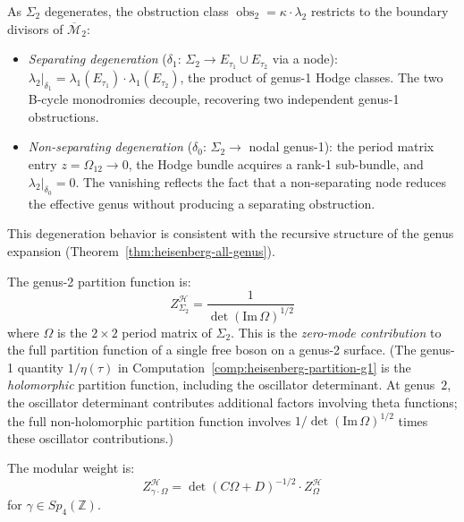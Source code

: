 \begin{remark}\label{rem:genus2-degeneration}
As $\Sigma_2$ degenerates, the obstruction class $\operatorname{obs}_2 = \kappa \cdot \lambda_2$ restricts to the boundary divisors of $\overline{\mathcal{M}}_2$:
\begin{itemize}
\item \emph{Separating degeneration}
  ($\delta_1$: $\Sigma_2 \to E_{\tau_1} \cup E_{\tau_2}$
  via a node):
  $\lambda_2|_{\delta_1}
  = \lambda_1(E_{\tau_1}) \cdot \lambda_1(E_{\tau_2})$,
  the product of genus-1 Hodge classes.  The two B-cycle
  monodromies decouple, recovering two independent
  genus-1 obstructions.
\item \emph{Non-separating degeneration}
  ($\delta_0$: $\Sigma_2 \to$ nodal genus-1): the period
  matrix entry $z = \Omega_{12} \to 0$, the Hodge bundle
  acquires a rank-1 sub-bundle, and
  $\lambda_2|_{\delta_0} = 0$.  The vanishing reflects
  the fact that a non-separating node reduces the
  effective genus without producing a separating
  obstruction.
\end{itemize}
This degeneration behavior is consistent with the recursive
structure of the genus expansion
(Theorem~\ref{thm:heisenberg-all-genus}).
\end{remark}

\begin{computation}\label{comp:partition-genus-two}
The genus-2 partition function is:
\begin{equation}
Z_{\Sigma_2}^{\mathcal{H}} = \frac{1}{\det(\mathrm{Im}\,\Omega)^{1/2}}
\end{equation}
where $\Omega$ is the $2 \times 2$ period matrix of $\Sigma_2$.
This is the \emph{zero-mode contribution} to the full partition
function of a single free boson on a genus-2 surface.
(The genus-1 quantity $1/\eta(\tau)$ in
Computation~\ref{comp:heisenberg-partition-g1} is the
\emph{holomorphic} partition function, including the oscillator
determinant.  At genus~$2$, the oscillator determinant contributes
additional factors involving theta functions; the full
non-holomorphic partition function involves
$1/\det(\mathrm{Im}\,\Omega)^{1/2}$ times these oscillator
contributions.)

The modular weight is:
\[Z_{\gamma \cdot \Omega}^{\mathcal{H}} = \det(C\Omega + D)^{-1/2} 
\cdot Z_{\Omega}^{\mathcal{H}}\]
for $\gamma \in Sp_4(\mathbb{Z})$.
\end{computation}

